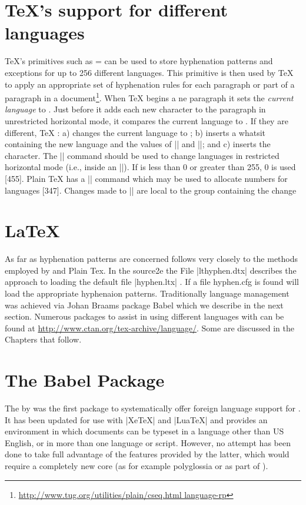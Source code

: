 \section{TeX's support for different languages}

TeX's primitives such as \cmd{\language}= can be used to store hyphenation patterns and exceptions for up to 256 different languages. This primitive is then used by TeX to apply an appropriate set of hyphenation rules for each paragraph or part of a paragraph in a document\footnote{\url{http://www.tug.org/utilities/plain/cseq.html language-rp}}. When TeX begins a ne paragraph it sets the \emph{current language} to \cmd{\language}. Just before it adds each new character to the paragraph in unrestricted horizontal mode, it compares the current language to \cmd{\language}. If they are different, TeX : a) changes the current language to \cmd{\language}; b) inserts a whatsit containing the new language and the values of |\lefthyphenmin| and |\righthyphenmin|; and c) inserts the character. The |\setlanguage| command should be used to change languages in restricted horizontal mode (i.e., inside an |\hbox|). If  is less than 0 or greater than 255, 0 is used [455]. Plain TeX has a |\newlanguage| command which may be used to allocate numbers for languages [347]. Changes made to |\language| are local to the group containing the change 

\section{LaTeX}

As far as hyphenation patterns are concerned \latexe follows very closely to the methods employed by \tex and Plain Tex. In the source2e the File |lthyphen.dtx| describes the approach to loading the default file |hyphen.ltx| . If a file hyphen.cfg is found \latexe will load the appropriate hyphenaion patterns. Traditionally language management was achieved via Johan 
Braams package Babel which we describe in the next section. Numerous packages to assist in using different languages with \latex can be found at \url{http://www.ctan.org/tex-archive/language/}. Some are discussed in the Chapters that follow.


\section{The Babel Package} 

The  by \citet{babel} was the first package to systematically offer foreign language
support for \tex. It has been updated for use with |XeTeX| and |LuaTeX| and provides an environment
in which documents can be typeset in a language
other than US English, or in more than one language
or script. However, no attempt has been done to
take full advantage of the features provided by the
latter, which would require a completely new core
(as for example polyglossia or as part of ).

